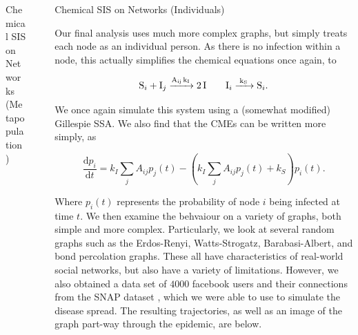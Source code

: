 \documentclass{beamer}
\newlength{\sepwid}
\newlength{\onecolwid}
\begin{document}
\begin{frame}[t]
\begin{columns}[t]
\begin{column}{\onecolwid}
\begin{block}{Chemical SIS on Networks (Metapopulation)}
\end{block}


\end{column} %

\begin{column}{\sepwid}\end{column} %

\begin{column}{\onecolwid} %


\begin{block}{Chemical SIS on Networks (Individuals)}

Our final analysis uses much more complex graphs, but simply treats each node as an individual person. As there is no infection within a node, this actually simplifies the chemical equations once again, to

\begin{equation}
	\ce{S_i + I_j ->[A_{ij} k_I] 2 I} \qquad \ce{I_i ->[k_S] S_i}.
\end{equation}

We once again simulate this system using a (somewhat modified) Gillespie SSA. We also find that the CMEs can be written more simply, as

\begin{equation}
	\frac {\mathrm d p_i} {\mathrm d t} = k_I \sum_j A_{ij} p_j(t) - \left( k_I \sum_j A_{ij} p_j(t) + k_S \right) p_i(t).
\end{equation}

Where $p_i(t)$ represents the probability of node $i$ being infected at time $t$. We then examine the behvaiour on a variety of graphs, both simple and more complex. Particularly, we look at several random graphs such as the Erdos-Renyi, Watts-Strogatz, Barabasi-Albert, and bond percolation graphs. These all have characteristics of real-world social networks, but also have a variety of limitations. However, we also obtained a data set of $4000$ facebook users and their connections from the SNAP dataset \cite{snapnets}, which we were able to use to simulate the disease spread. The resulting trajectories, as well as an image of the graph part-way through the epidemic, are below.


\end{block}
\end{column}
\end{columns}
\end{frame}
\end{document}
